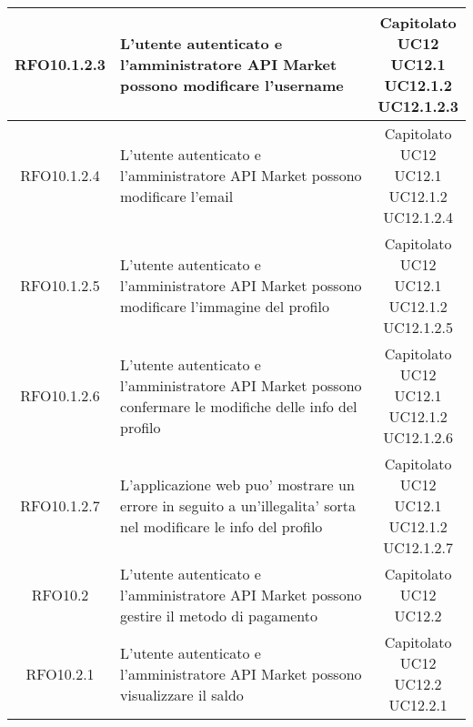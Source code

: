 \begin{longtable}{|c|p{8cm}|c|}
RFO10.1.2.3 &  L'utente autenticato e l'amministratore API Market possono modificare l'username & \makecell*{Capitolato\\UC12\\UC12.1\\UC12.1.2\\UC12.1.2.3} \\
\hline

RFO10.1.2.4 &  L'utente autenticato e l'amministratore API Market possono modificare l'email & \makecell*{Capitolato\\UC12\\UC12.1\\UC12.1.2\\UC12.1.2.4} \\
\hline

RFO10.1.2.5 &  L'utente autenticato e l'amministratore API Market possono modificare l'immagine del profilo & \makecell*{Capitolato\\UC12\\UC12.1\\UC12.1.2\\UC12.1.2.5} \\
\hline

RFO10.1.2.6 &  L'utente autenticato e l'amministratore API Market possono confermare le modifiche delle info del profilo & \makecell*{Capitolato\\UC12\\UC12.1\\UC12.1.2\\UC12.1.2.6} \\
\hline

RFO10.1.2.7 &  L'applicazione web puo' mostrare un errore in seguito a un'illegalita' sorta nel modificare le info del profilo & \makecell*{Capitolato\\UC12\\UC12.1\\UC12.1.2\\UC12.1.2.7} \\
\hline

RFO10.2 &  L'utente autenticato e l'amministratore API Market possono gestire il metodo di pagamento & \makecell*{Capitolato\\UC12\\UC12.2} \\
\hline

RFO10.2.1 &  L'utente autenticato e l'amministratore API Market possono visualizzare il saldo & \makecell*{Capitolato\\UC12\\UC12.2\\UC12.2.1} \\
\hline


\end{longtable}

